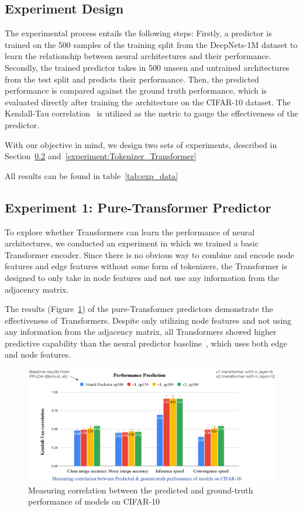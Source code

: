 \documentclass{article}
\begin{document}
\subsection{Experiment Design}
The experimental process entails the following steps: Firstly, a predictor is trained on the 500 samples of the training split from the DeepNets-1M dataset to learn the relationship between neural architectures and their performance. Secondly, the trained predictor takes in 500 unseen and untrained architectures from the test split and predicts their performance. Then, the predicted performance is compared against the ground truth performance, which is evaluated directly after training the architecture on the CIFAR-10 dataset. The Kendall-Tau correlation~\cite{kendal_tau} is utilized as the metric to gauge the effectiveness of the predictor.

With our objective in mind, we design two sets of experiments, described in Section~\ref{experiment:PureTransformer} and~\ref{experiment:Tokenizer_Transformer}  

All results can be found in table~\ref{tab:exp_data}




\subsection{Experiment 1: Pure-Transformer Predictor}
\label{experiment:PureTransformer}
To explore whether Transformers can learn the performance of neural architectures, we conducted an experiment in which we trained a basic Transformer encoder. Since there is no obvious way to combine and encode node features and edge features without some form of tokenizers, the Transformer is designed to only take in node features and not use any information from the adjacency matrix.

The results (Figure~\ref{exp1-1_results}) of the pure-Transformer predictors demonstrate the effectiveness of Transformers. Despite only utilizing node features and not using any information from the adjacency matrix, all Transformers showed higher predictive capability than the neural predictor baseline~\cite{NeurPred}, which uses both edge and node features. 
\begin{figure}
    \centering
    \includegraphics[width=\textwidth]{images/exp1-1_results.png}
    \caption{Measuring correlation between the predicted and ground-truth performance of models on CIFAR-10}
    \label{exp1-1_results}
\end{figure}
\end{document}
